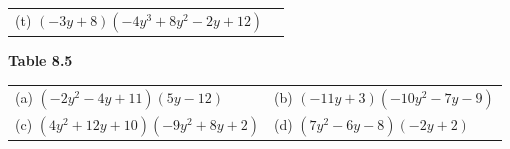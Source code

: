 \begin{enumerate}[noitemsep, label=\textbf{\arabic*}. ]
{{\begin{center}
\begin{tabular}[t]{|l|l|}
        (t) $\left(-3y+8\right)\left(-4{y}^{3}+8{y}^{2}-2y+12\right)$%
     \tabularnewline\cline{1-1}\cline{2-2}
    \end{tabular}
      \end{center}
    \begin{center}{\small\bfseries Table 8.5}\end{center}
          }{ %
        \begin{center}
      \label{m39387*id273574}
    \noindent
      \tablelasttail{}
      \begin{xtabular}[t]{|l|l|}\hline
        (a) $\left(-2{y}^{2}-4y+11\right)\left(5y-12\right)$ &
        (b) $\left(-11y+3\right)\left(-10{y}^{2}-7y-9\right)$%
     \tabularnewline{}
        (c) $\left(4{y}^{2}+12y+10\right)\left(-9{y}^{2}+8y+2\right)$ &
        (d) $\left(7{y}^{2}-6y-8\right)\left(-2y+2\right)$%
     \tabularnewline{}

\end{xtabular}
\end{center}}}
\end{enumerate}
